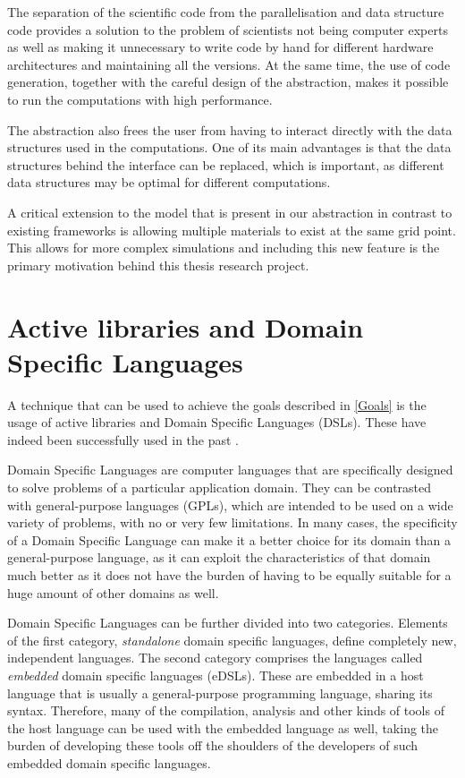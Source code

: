 \documentclass[fontsize=11pt, appendixprefix=true]{scrreprt}
\begin{document}
The separation of the scientific code from the parallelisation and data
structure code provides a solution to the problem of scientists not being
computer experts as well as making it unnecessary to write code by hand for
different hardware architectures and maintaining all the versions. At the same
time, the use of code generation, together with the careful design of the
abstraction, makes it possible to run the computations with high performance.

The abstraction also frees the user from having to interact directly with the
data structures used in the computations. One of its main advantages is that the
data structures behind the interface can be replaced, which is important, as
different data structures may be optimal for different computations.

A critical extension to the model that is present in our abstraction in contrast
to existing frameworks is allowing multiple materials to exist at the same
grid point. This allows for more complex simulations and including this new
feature is the primary motivation behind this thesis research project.

\section{Active libraries and Domain Specific Languages}
\label{eDSLs}

A technique that can be used to achieve the goals described in \autoref{Goals}
is the usage of active libraries and Domain Specific Languages (DSLs). These
have indeed been successfully used in the past \cite{OPS, OP2}.

Domain Specific Languages are computer languages that are specifically designed
to solve problems of a particular application domain. They can be contrasted
with general-purpose languages (GPLs), which are intended to be used on a wide
variety of problems, with no or very few limitations. In many cases, the
specificity of a Domain Specific Language can make it a better choice for its
domain than a general-purpose language, as it can exploit the characteristics of
that domain much better as it does not have the burden of having to be equally
suitable for a huge amount of other domains as well.

Domain Specific Languages can be further divided into two categories. Elements
of the first category, \textit{standalone} domain specific languages, define
completely new, independent languages. The second category comprises the
languages called \textit{embedded} domain specific languages (eDSLs). These are
embedded in a host language that is usually a general-purpose programming
language, sharing its syntax. Therefore, many of the compilation, analysis and
other kinds of tools of the host language can be used with the embedded language
as well, taking the burden of developing these tools off the shoulders of the
developers of such embedded domain specific languages.
\end{document}
